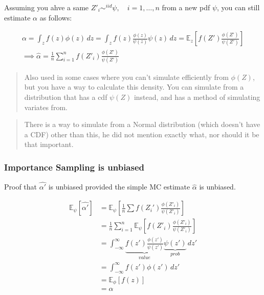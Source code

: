 \documentclass[
  oneside]{book}
\begin{document}
Assuming you ahve a same \(Z'_{i} \sim^{iid} \psi, \quad i = 1,\dots,n\) from a new pdf \(\psi\), you can still estimate \(\alpha\) as follows:

\[
\begin{gathered}
\alpha = \int _{z} f(z) \phi(z) \, dz = \int _{z} f(z) \frac{\phi(z)}{\psi(z)} \psi(z) \, dz = \mathbb{E}_{z}\left[ f(Z') \frac{\phi(Z')}{\psi(Z')} \right]\\
\implies\hat{\alpha} = \frac{1}{n} \sum^{n}_{i=1} f(Z'_{i}) \frac{\phi(Z')}{\psi(Z')}
\end{gathered}
\]

\begin{quote}
Also used in some cases where you can't simulate efficiently from \(\phi(Z)\), but you have a way to calculate this density. You can simulate from a distribution that has a cdf \(\psi(Z)\) instead, and has a method of simulating variates from.
\end{quote}

\begin{quote}
There is a way to simulate from a Normal distribution (which doesn't have a CDF) other than this, he did not mention exactly what, nor should it be that important.
\end{quote}

\hypertarget{importance-sampling-is-unbiased}{%
\subsubsection{Importance Sampling is unbiased}\label{importance-sampling-is-unbiased}}

Proof that \(\hat{\alpha'}\) is unbiased provided the simple MC estimate \(\hat{\alpha}\) is unbiased.

\[
\begin{aligned}
\mathbb{E}_{\psi}[\hat{\alpha'}] &= \mathbb{E}_{\psi} \left[ \frac{1}{n} \sum f(Z_{i}') \frac{\phi(Z'_{i})}{\psi(Z'_{i})} \right]\\
&= \frac{1}{n} \sum_{i=1}^{n} \mathbb{E}_{\psi} \left[ f(Z'_{i}) \frac{\phi(Z'_{i})}{\psi(Z'_{i})} \right]\\
&= \int _{-\infty}^{\infty} \underbrace{ f(z') \frac{\phi(z')}{\psi(z')} }_{ value } \underbrace{ \psi(z') }_{ prob } \, dz'\\
&= \int ^{\infty}_{-\infty} f(z') \phi(z') \, dz'\\
&= \mathbb{E}_{\phi} \left[ f(z) \right] \\
&= \alpha
\end{aligned}
\]
\end{document}
